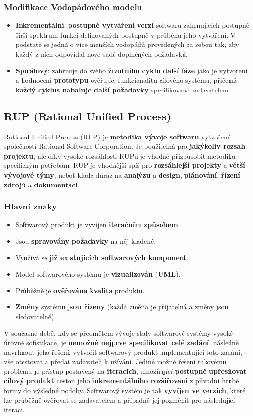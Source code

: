 \subsubsection{Modifikace Vodopádového modelu}
\begin{itemize}
\item \textbf{Inkrementální}: \textbf{postupné vytváření verzí} softwaru zahrnujících postupně širší spektrum funkcí definovaných postupně v průběhu jeho vytváření. V podstatě se jedná o více menších vodopádů provedených za sebou tak, aby každý z nich odpovídal nové sadě doplněných požadavků.
\item \textbf{Spirálový}: zahrnuje do svého \textbf{životního cyklu další fáze} jako je vytvoření a hodnocení \textbf{prototypu} ověřující funkcionalitu cílového systému, přičemž \textbf{každý cyklus nabaluje další požadavky} specifikované zadavatelem.
\end{itemize}


\subsection{RUP (Rational Unified Process)}
Rational Unified Process (RUP) je \textbf{metodika vývoje softwaru} vytvořená společností Rational Software Corporation. Je použitelná pro \textbf{jakýkoliv rozsah projektu}, ale díky vysoké rozsáhlosti RUPu je vhodné přizpůsobit metodiku specifickým potřebám. RUP je vhodnější spíš pro \textbf{rozsáhlejší projekty} a \textbf{větší vývojové týmy}, neboť klade důraz na \textbf{analýzu} a \textbf{design}, \textbf{plánování}, \textbf{řízení zdrojů} a \textbf{dokumentaci}.

\subsubsection{Hlavní znaky}
\begin{itemize}
\item Softwarový produkt je vyvíjen \textbf{iteračním způsobem}.
\item Jsou \textbf{spravovány požadavky} na něj kladené.
\item Využívá se \textbf{již existujících softwarových komponent}.
\item Model softwarového systému je \textbf{vizualizován} (\textbf{UML}).
\item Průběžně je \textbf{ověřována} \textbf{kvalita} produktu.
\item \textbf{Změny} systému\textbf{ jsou řízeny} (každá změna je přijatelná a změny jsou sledovatelné).
\end{itemize}
V současné době, kdy se předmětem vývoje staly softwarové systémy vysoké úrovně sofistikace, je \textbf{nemožné nejprve specifikovat celé zadání}, následně navrhnout jeho řešení, vytvořit softwarový produkt implementující toto zadání, vše otestovat a předat zadavateli k užívání. Jediné možné řešení takovému problému je přístup postavený na \textbf{iteracích}, umožňující \textbf{postupně upřesňovat cílový produkt} cestou jeho \textbf{inkrementálního rozšiřovaní} z původní hrubé formy do výsledné podoby.  Softwarový systém je tak \textbf{vyvíjen ve verzích}, které lze průběžně ověřovat se zadavatelem a případně jej pozměnit pro následující iteraci.


